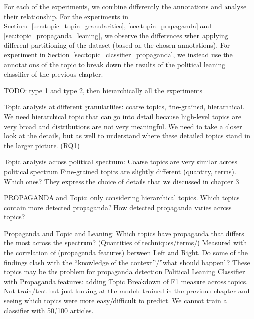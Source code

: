 


For each of the experiments, we combine differently the annotations and analyse their relationship. For the experiments in Sections~\ref{sec:topic_topic_granularities}, \ref{sec:topic_propaganda} and \ref{sec:topic_propaganda_leaning}, we observe the differences when applying different partitioning of the dataset (based on the chosen annotations). For experiment in Section~\ref{sec:topic_classifier_propaganda}, we instead use the annotations of the topic to break down the results of the political leaning classifier of the previous chapter.

TODO: type 1 and type 2, then hierarchically all the experiments

Topic analysis at different granularities:
coarse topics, fine-grained, hierarchical. We need hierarchical topic that can go into detail because high-level topics are very broad and distributions are not very meaningful. We need to take a closer look at the details, but as well to understand where these detailed topics stand in the larger picture. (RQ1)

Topic analysis across political spectrum:
Coarse topics are very similar across political spectrum
Fine-grained topics are slightly different (quantity, terms). Which ones? They express the choice of details that we discussed in chapter 3

PROPAGANDA and Topic: only considering hierarchical topics.
Which topics contain more detected propaganda?
How detected propaganda varies across topics? 

Propaganda and Topic and Leaning:
Which topics have propaganda that differs the most across the spectrum? (Quantities of techniques/terms/) Measured with the correlation of (propaganda features) between Left and Right.
Do some of the findings clash with the “knowledge of the context”/”what should happen”? These topics may be the problem for propaganda detection
Political Leaning Classifier with Propaganda features: adding Topic
Breakdown of F1 measure across topics. Not train/test but just looking at the models trained in the previous chapter and seeing which topics were more easy/difficult to predict. We cannot train a classifier with 50/100 articles.



